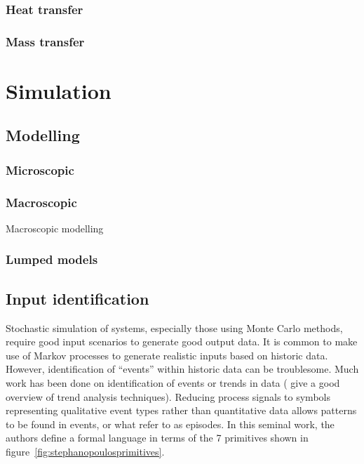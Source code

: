\subsubsection{Heat transfer}
\subsubsection{Mass transfer}

\section{Simulation}

\subsection{Modelling}
\subsubsection{Microscopic}

\subsubsection{Macroscopic}
Macroscopic modelling 

\subsubsection{Lumped models}

\subsection{Input identification}
Stochastic simulation of systems, especially those using Monte Carlo
methods, require good input scenarios to generate good output data.
It is common to make use of Markov processes to generate realistic
inputs based on historic data.  However, identification of ``events''
within historic data can be troublesome.  Much work has been done on
identification of events or trends in data (\citet{maurya.rengaswamy.ea2007fault}
give a good overview of trend analysis techniques).  Reducing process
signals to symbols representing qualitative event types rather than
quantitative data allows patterns to be found in events, or what
\citet{Cheung1990Representation} refer to as
episodes.  In this seminal work, the authors define a formal language
in terms of the 7 primitives shown in
figure~\ref{fig:stephanopoulosprimitives}.

